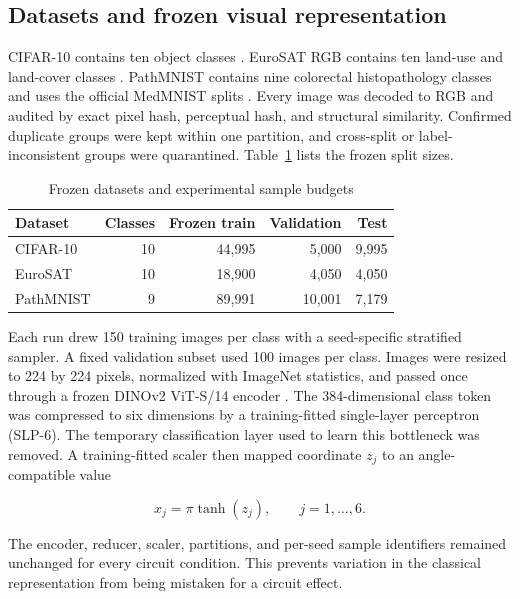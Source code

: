 \documentclass[pdflatex,sn-mathphys-num]{sn-jnl}
\begin{document}
\subsection{Datasets and frozen visual representation}

CIFAR-10 contains ten object classes \cite{KRIZHEVSKY-2009}. EuroSAT RGB contains ten land-use and land-cover classes \cite{HELBER-2019}. PathMNIST contains nine colorectal histopathology classes and uses the official MedMNIST splits \cite{MEDMNIST-2023}. Every image was decoded to RGB and audited by exact pixel hash, perceptual hash, and structural similarity. Confirmed duplicate groups were kept within one partition, and cross-split or label-inconsistent groups were quarantined. Table~\ref{tab:data} lists the frozen split sizes.

\begin{table}[htbp]
\caption{Frozen datasets and experimental sample budgets}\label{tab:data}
\centering
\scriptsize
\begin{tabular}{@{}lrrrr@{}}
\toprule
\textbf{Dataset} & \textbf{Classes} & \textbf{Frozen train} & \textbf{Validation} & \textbf{Test} \\
\midrule
CIFAR-10 & 10 & 44,995 & 5,000 & 9,995 \\
EuroSAT & 10 & 18,900 & 4,050 & 4,050 \\
PathMNIST & 9 & 89,991 & 10,001 & 7,179 \\
\bottomrule
\end{tabular}
\end{table}

Each run drew 150 training images per class with a seed-specific stratified sampler. A fixed validation subset used 100 images per class. Images were resized to 224 by 224 pixels, normalized with ImageNet statistics, and passed once through a frozen DINOv2 ViT-S/14 encoder \cite{DINOV2-2024}. The 384-dimensional class token was compressed to six dimensions by a training-fitted single-layer perceptron (SLP-6). The temporary classification layer used to learn this bottleneck was removed. A training-fitted scaler then mapped coordinate $z_j$ to an angle-compatible value

\begin{equation}
x_j = \pi\tanh(z_j), \qquad j=1,\ldots,6.
\label{eq:scale}
\end{equation}

The encoder, reducer, scaler, partitions, and per-seed sample identifiers remained unchanged for every circuit condition. This prevents variation in the classical representation from being mistaken for a circuit effect.
\end{document}
